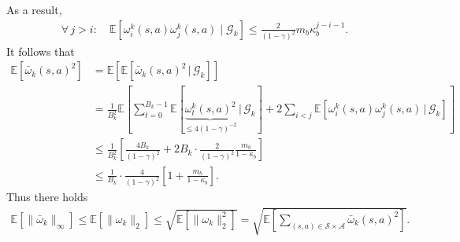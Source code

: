 \documentclass[10pt]{article}
\newcommand{\calA}{\mathcal{A}}
\newcommand{\calS}{\mathcal{S}}
\newcommand{\calG}{\mathcal{G}}
\newcommand{\E}{\mathbb{E}}
\newcommand{\ls}{\left}
\newcommand{\rs}{\right}
\theoremstyle{plain}
\theoremstyle{definition}
\begin{document}
    As a result,
    \begin{align*}
        \forall\, j > i: \quad \E\ls[ \omega_i^k(s,a) \omega_j^k(s,a) \; \big | \; \calG_k \rs] \leq \frac{2}{(1-\gamma)^2} m_b \kappa_b^{j-i-1}.
    \end{align*}
  It follows that
    \begin{align*}
        \E\ls[ \bar\omega_k(s,a)^2 \rs] &= \E \ls[ \E\ls[ \bar\omega_k(s,a)^2 \, | \, \calG_k \rs] \rs] \\
        &= \frac{1}{B_k^2} \E\ls[ \sum_{t=0}^{B_k-1} \E\ls[ \underbrace{\omega_t^k(s,a)^2}_{\leq 4(1-\gamma)^{-2}} \, \Big | \, \calG_k \rs] + 2\sum_{i<j} \E\ls[ \omega_i^k(s,a) \omega_j^k(s,a) \, | \, \calG_k \rs] \rs] \\
        &\leq \frac{1}{B_k^2} \ls[ \frac{4B_k}{(1-\gamma)^2} + 2B_k \cdot \frac{2}{(1-\gamma)^2} \frac{m_b}{1-\kappa_b} \rs] \\
        &\leq \frac{1}{B_k} \cdot \frac{4}{(1-\gamma)^2} \ls[ 1+ \frac{m_b}{1-\kappa_b} \rs].
    \end{align*}
   Thus there holds
    \begin{align*}
        \E\ls[ \| \bar\omega_k \|_\infty \rs] \leq \E\ls[ \| \omega_k \|_2 \rs] \leq \sqrt{\E\ls[ \| \omega_k \|_2^2 \rs]} = \sqrt{\E\ls[ \sum_{(s,a)\in\calS\times\calA} \bar\omega_k(s,a)^2 \rs]}.
    \end{align*}
\end{document}

